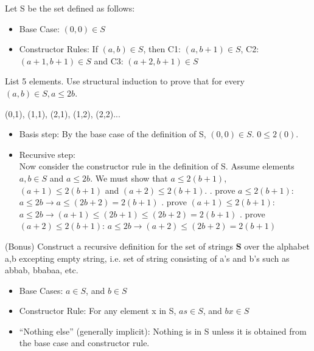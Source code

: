 \documentclass[solution, letterpaper]{cs20inclass}
\begin{document}
\problem Let S be the set defined as follows:
\begin{itemize}
\item Base Case: $(0,0) \in S$
\item Constructor Rules: If $(a,b)\in S$, then C1: $(a, b+1) \in S$, C2: $(a+1,b+1)\in S$ and C3: $(a+2, b+1)\in S$ 
\end{itemize}
\subproblem List 5 elements.
\subproblem Use structural induction to prove that for every $(a,b)\in S, a\leq 2b$.

\begin{solution}
\subsolution (0,1), (1,1), (2,1), (1,2), (2,2)...
\subsolution
\begin{itemize}
\item Basis step: By the base case of the definition of S, $(0,0)\in S$. $0\leq2(0)$.
\item Recursive step: \\
Now consider the constructor rule in the definition of S. Assume elements $a,b\in S$ and $ a\leq 2b$. We must  show that $a\leq2(b+1)$, $(a+1)\leq2(b+1)$ and $(a+2)\leq2(b+1)$.
. prove $a\leq2(b+1)$:  $a\leq2b\rightarrow a\leq(2b+2)=2(b+1)$
. prove $(a+1)\leq2(b+1)$: $a\leq2b \rightarrow (a+1)\leq(2b+1)\leq(2b+2)=2(b+1)$
. prove $(a+2)\leq2(b+1)$:  $a\leq2b \rightarrow (a+2)\leq(2b+2)=2(b+1)$
\end{itemize}
\end{solution}

\problem (Bonus) Construct a recursive definition for the set of strings \textbf{S} over the alphabet a,b excepting empty string, i.e. set of string consisting of a's and b's such as abbab, bbabaa, etc.

\begin{solution}
\begin{itemize}
\item Base Cases:  $a\in S$, and $b \in S$
\item Constructor Rule: For any element x in S, $as \in S$, and $bx \in S$
\item “Nothing else” (generally implicit): Nothing is in S unless it is obtained from the base case and constructor rule.
\end{itemize}
\end{solution}
\end{document}
